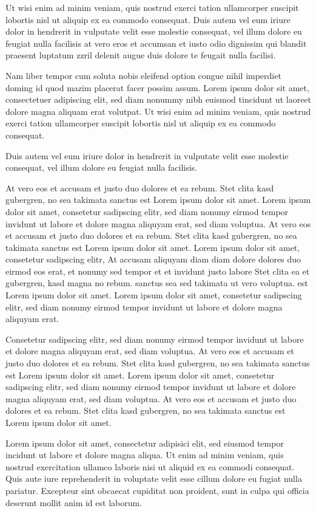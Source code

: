 \documentclass[twoside,a4paper]{article}
\begin{document}
Ut wisi enim ad minim veniam, quis nostrud exerci tation ullamcorper suscipit lobortis nisl ut aliquip ex ea commodo consequat. Duis autem vel eum iriure dolor in hendrerit in vulputate velit esse molestie consequat, vel illum dolore eu feugiat nulla facilisis at vero eros et accumsan et iusto odio dignissim qui blandit praesent luptatum zzril delenit augue duis dolore te feugait nulla facilisi.

Nam liber tempor cum soluta nobis eleifend option congue nihil imperdiet doming id quod mazim placerat facer possim assum. Lorem ipsum dolor sit amet, consectetuer adipiscing elit, sed diam nonummy nibh euismod tincidunt ut laoreet dolore magna aliquam erat volutpat. Ut wisi enim ad minim veniam, quis nostrud exerci tation ullamcorper suscipit lobortis nisl ut aliquip ex ea commodo consequat.

Duis autem vel eum iriure dolor in hendrerit in vulputate velit esse molestie consequat, vel illum dolore eu feugiat nulla facilisis.

At vero eos et accusam et justo duo dolores et ea rebum. Stet clita kasd gubergren, no sea takimata sanctus est Lorem ipsum dolor sit amet. Lorem ipsum dolor sit amet, consetetur sadipscing elitr, sed diam nonumy eirmod tempor invidunt ut labore et dolore magna aliquyam erat, sed diam voluptua. At vero eos et accusam et justo duo dolores et ea rebum. Stet clita kasd gubergren, no sea takimata sanctus est Lorem ipsum dolor sit amet. Lorem ipsum dolor sit amet, consetetur sadipscing elitr, At accusam aliquyam diam diam dolore dolores duo eirmod eos erat, et nonumy sed tempor et et invidunt justo labore Stet clita ea et gubergren, kasd magna no rebum. sanctus sea sed takimata ut vero voluptua. est Lorem ipsum dolor sit amet. Lorem ipsum dolor sit amet, consetetur sadipscing elitr, sed diam nonumy eirmod tempor invidunt ut labore et dolore magna aliquyam erat.

Consetetur sadipscing elitr, sed diam nonumy eirmod tempor invidunt ut labore et dolore magna aliquyam erat, sed diam voluptua. At vero eos et accusam et justo duo dolores et ea rebum. Stet clita kasd gubergren, no sea takimata sanctus est Lorem ipsum dolor sit amet. Lorem ipsum dolor sit amet, consetetur sadipscing elitr, sed diam nonumy eirmod tempor invidunt ut labore et dolore magna aliquyam erat, sed diam voluptua. At vero eos et accusam et justo duo dolores et ea rebum. Stet clita kasd gubergren, no sea takimata sanctus est Lorem ipsum dolor sit amet.

Lorem ipsum dolor sit amet, consectetur adipisici elit, sed eiusmod tempor incidunt ut labore et dolore magna aliqua. Ut enim ad minim veniam, quis nostrud exercitation ullamco laboris nisi ut aliquid ex ea commodi consequat. Quis aute iure reprehenderit in voluptate velit esse cillum dolore eu fugiat nulla pariatur. Excepteur sint obcaecat cupiditat non proident, sunt in culpa qui officia deserunt mollit anim id est laborum.
\end{document}
